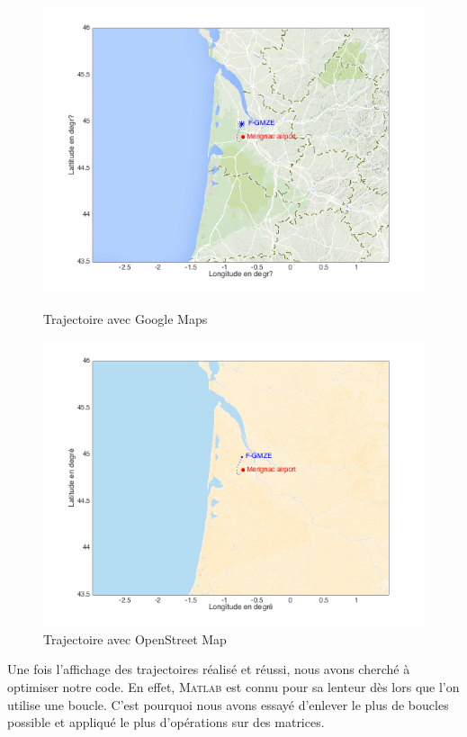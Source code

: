 \documentclass[a4paper, 10pt]{article}
\begin{document}
    \begin{figure}[h!]
        \begin{minipage}[b]{0.45\linewidth}
    	    \centering
    	    \includegraphics[scale=0.35]{plot_pos_F-GMZE.png}
            \caption{Trajectoire avec Google Maps}
        \end{minipage} \hfill
        \begin{minipage}[b]{.45\linewidth}
    	    \centering
    	    \includegraphics[scale=0.35]{plot_pos_F-GMZE_osm.png}
            \caption{Trajectoire avec OpenStreet Map}
        \end{minipage}
    \end{figure}
    
    \newpage
    Une fois l'affichage des trajectoires réalisé et réussi, nous avons cherché à optimiser notre code. En effet, M\textsc{atlab} est connu pour sa lenteur dès lors que l'on utilise une boucle. C'est pourquoi nous avons essayé d'enlever le plus de boucles possible et appliqué le plus d'opérations sur des matrices.
    
\end{document}
